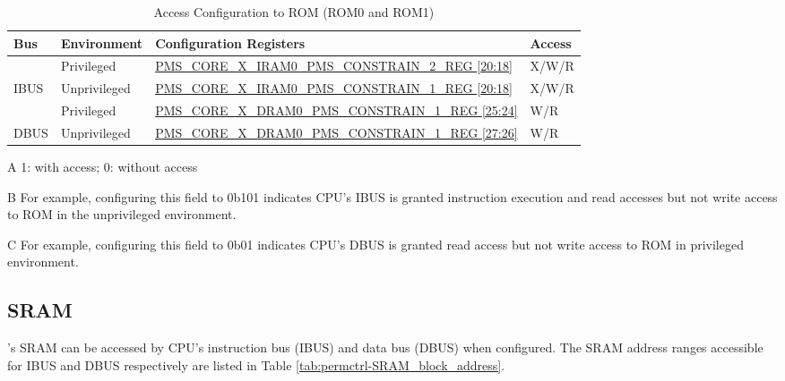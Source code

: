 \documentclass[main\_\_EN.tex]{subfiles}
\begin{document}
\begin{table}[H]
    \centering
    \caption{Access Configuration to ROM (ROM0 and ROM1)}
    \label{tab:permctrl-rom_permconfig}
    \begin{threeparttable}
    \begin{tabular}{|l|l|l|l|}
        \hline
        \rowcolor{lightgray}
        \textbf{Bus} & \textbf{Environment} & \textbf{Configuration Registers\tnote{A}}                         & \textbf{Access} \\ \hline
                     & Privileged      & \hyperref[regdesc:PMSCOREXIRAM0PMSCONSTRAIN2REG]{PMS\_CORE\_X\_IRAM0\_PMS\_CONSTRAIN\_2\_REG   {[}20:18{]}}\tnote{B} & X/W/R           \\ \cline{2-4}
        \multirow{-2}{*}{IBUS} & Unprivileged & \hyperref[regdesc:PMSCOREXIRAM0PMSCONSTRAIN1REG]{PMS\_CORE\_X\_IRAM0\_PMS\_CONSTRAIN\_1\_REG {[}20:18{]}}\tnote{B}    & X/W/R \\ \hline
                     & Privileged      & \hyperref[regdesc:PMSCOREXDRAM0PMSCONSTRAIN1REG]{PMS\_CORE\_X\_DRAM0\_PMS\_CONSTRAIN\_1\_REG   {[}25:24{]}}\tnote{C} & W/R             \\ \cline{2-4}
        \multirow{-2}{*}{DBUS} & Unprivileged & \hyperref[regdesc:PMSCOREXDRAM0PMSCONSTRAIN1REG]{PMS\_CORE\_X\_DRAM0\_PMS\_CONSTRAIN\_1\_REG   {[}27:26{]}} & W/R   \\ \hline

        \end{tabular}
        \begin{tablenotes}
        \item[A] 1: with access; 0: without access
        \item[B] For example, configuring this field to 0b101 indicates CPU's IBUS is granted instruction execution and read accesses but not write access to ROM in the unprivileged environment.
        \item[C] For example, configuring this field to 0b01 indicates CPU's DBUS is granted read access but not write access to ROM in privileged environment.
        \end{tablenotes}
     \end{threeparttable}
    \end{table}

\subsection{SRAM}

\chipname{}'s SRAM can be accessed by CPU's instruction bus (IBUS) and data bus (DBUS) when configured. The SRAM address ranges accessible for IBUS and DBUS respectively are listed in Table  \ref{tab:permctrl-SRAM_block_address}.
\end{document}
